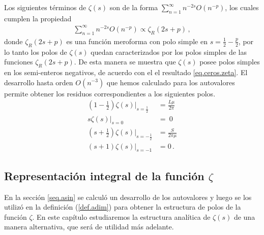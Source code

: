 Los siguientes términos de $\zeta (s)$ son de la forma $\sum _{n=1} ^{\infty} n ^{-2s} O ( n ^{-p})$, los cuales cumplen la propiedad
\begin{align}
	\sum _{n=1} ^{\infty} n ^{-2s} O ( n ^{-p}) 
	\propto
	\zeta _R (2s+p)
	\, ,
\end{align}
donde $\zeta _R (2s+p)$ es una función meroforma con polo simple en $s = \frac{1}{2} - \frac{p}{2}$,
por lo tanto los polos de $\zeta (s)$ quedan caracterizados por los polos simples de las funciones  $\zeta _R (2s+p)$. De esta manera se muestra que $\zeta (s)$ posee polos simples en los semi-enteros negativos, de acuerdo con el el resultado \eqref{eq.ceros.zeta}. El desarrollo hasta orden $O(n^{-3})$ que hemos calculado para los autovalores permite obtener los residuos correspondientes a los siguientes polos.
\begin{equation}
\begin{aligned}\label{eq.polos.asin}
	\left(1- \frac{1}{2} \right) \zeta  (s)| _{s=\frac{1}{2}} &= 
\frac{L \mu }{2 \pi } 
\\[5pt]
	s \zeta  (s) |_{s=0} &= \ 0 
\\[5pt]
	\left( s + \frac{1}{2} \right)\zeta  (s) | _{s=-\frac{1}{2}} &= 		\frac{S}{2 \pi \mu } 
\\[5pt]
	(s+1) \zeta (s) |_{s=-1} &=  0
	\, .
\end{aligned}
\end{equation}



\subsection{Representación integral de la función $\zeta$}
{\label{sec.complejo}}

En la sección \ref{seq.asin} se calculó un desarrollo de los autovalores y luego se
los utilizó en la definición (\ref{def.adim}) para obtener
la estructura de polos de la función $\zeta$. En este capítulo estudiaremos la
estructura analítica de $\zeta (s)$ de una manera alternativa, que será de utilidad
más adelante.


